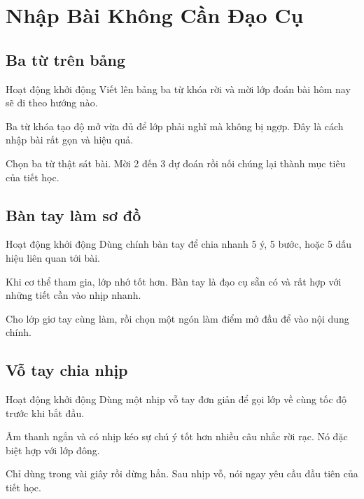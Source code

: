 \chapter{Nhập Bài Không Cần Đạo Cụ}

\section{Ba từ trên bảng}
\begin{khoidongbox}{Hoạt động khởi động}
Viết lên bảng ba từ khóa rời và mời lớp đoán bài hôm nay sẽ đi theo hướng nào.
\end{khoidongbox}
\begin{visaohieuqua}
Ba từ khóa tạo độ mở vừa đủ để lớp phải nghĩ mà không bị ngợp. Đây là cách nhập bài rất gọn và hiệu quả.
\end{visaohieuqua}
\begin{cachlam5phut}
Chọn ba từ thật sát bài. Mời 2 đến 3 dự đoán rồi nối chúng lại thành mục tiêu của tiết học.
\end{cachlam5phut}
\ngancach

\section{Bàn tay làm sơ đồ}
\begin{khoidongbox}{Hoạt động khởi động}
Dùng chính bàn tay để chia nhanh 5 ý, 5 bước, hoặc 5 dấu hiệu liên quan tới bài.
\end{khoidongbox}
\begin{visaohieuqua}
Khi cơ thể tham gia, lớp nhớ tốt hơn. Bàn tay là đạo cụ sẵn có và rất hợp với những tiết cần vào nhịp nhanh.
\end{visaohieuqua}
\begin{cachlam5phut}
Cho lớp giơ tay cùng làm, rồi chọn một ngón làm điểm mở đầu để vào nội dung chính.
\end{cachlam5phut}
\ngancach

\section{Vỗ tay chia nhịp}
\begin{khoidongbox}{Hoạt động khởi động}
Dùng một nhịp vỗ tay đơn giản để gọi lớp về cùng tốc độ trước khi bắt đầu.
\end{khoidongbox}
\begin{visaohieuqua}
Âm thanh ngắn và có nhịp kéo sự chú ý tốt hơn nhiều câu nhắc rời rạc. Nó đặc biệt hợp với lớp đông.
\end{visaohieuqua}
\begin{cachlam5phut}
Chỉ dùng trong vài giây rồi dừng hẳn. Sau nhịp vỗ, nói ngay yêu cầu đầu tiên của tiết học.
\end{cachlam5phut}
\ngancach

